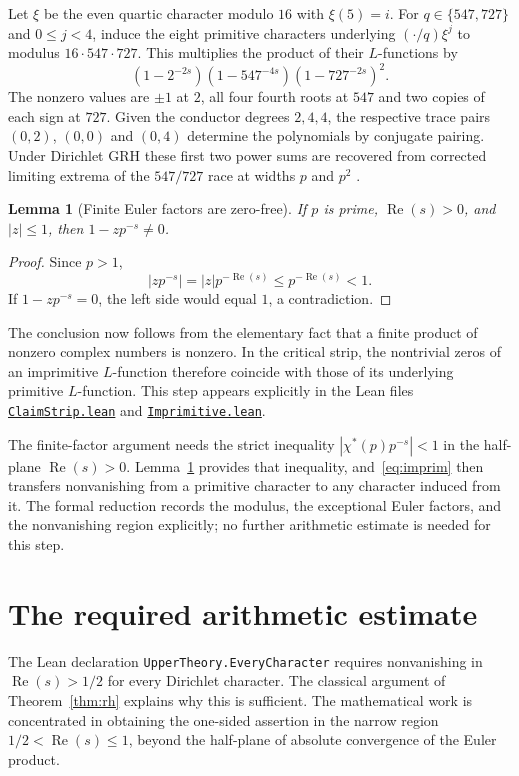 \documentclass[11pt,openany,oneside]{scrbook}
\newtheorem{lemma}[theorem]{Lemma}
\theoremstyle{definition}
\theoremstyle{remark}
\newcommand{\Rea}{\operatorname{Re}}
\newcommand{\baseurl}{https://github.com/CocoSgt/riemann-hypothesis-lean/blob/7cbf7a0c32fca1badf05931879a37c3f8a2b03b4/}
\newcommand{\sourcefile}[2]{\href{\baseurl#1}{\texttt{#2}}}
\begin{document}
Let $\xi$ be the even quartic character modulo $16$ with $\xi(5)=i$. For $q\in\{547,727\}$ and $0\le j<4$, induce the eight primitive characters underlying $(\cdot/q)\xi^j$ to modulus $16\cdot547\cdot727$. This multiplies the product of their $L$-functions by
\[
(1-2^{-2s})(1-547^{-4s})(1-727^{-2s})^2.
\]
The nonzero values are $\pm1$ at $2$, all four fourth roots at $547$ and two copies of each sign at $727$. Given the conductor degrees $2,4,4$, the respective trace pairs $(0,2)$, $(0,0)$ and $(0,4)$ determine the polynomials by conjugate pairing. Under Dirichlet GRH these first two power sums are recovered from corrected limiting extrema of the $547/727$ race at widths $p$ and $p^2$ \parencite{Crossley2026WidthCusp}.

\begin{lemma}[Finite Euler factors are zero-free]\label{lem:euler}
If $p$ is prime, $\Rea(s)>0$, and $|z|\le1$, then $1-zp^{-s}\ne0$.
\end{lemma}
\begin{proof}
Since $p>1$,
\[
|zp^{-s}|=|z|p^{-\Rea(s)}\le p^{-\Rea(s)}<1.
\]
If $1-zp^{-s}=0$, the left side would equal $1$, a contradiction.
\end{proof}

The conclusion now follows from the elementary fact that a finite product of nonzero complex numbers is nonzero. In the critical strip, the nontrivial zeros of an imprimitive $L$-function therefore coincide with those of its underlying primitive $L$-function. This step appears explicitly in the Lean files \sourcefile{src/Development/AutomorphicArithmetic/CharacterBoxes/ClaimStrip.lean}{ClaimStrip.lean} and \sourcefile{src/Development/AutomorphicArithmetic/CharacterBoxes/Imprimitive.lean}{Imprimitive.lean}.

The finite-factor argument needs the strict inequality $|\chi^*(p)p^{-s}|<1$ in the half-plane $\Rea(s)>0$. Lemma~\ref{lem:euler} provides that inequality, and~\eqref{eq:imprim} then transfers nonvanishing from a primitive character to any character induced from it. The formal reduction records the modulus, the exceptional Euler factors, and the nonvanishing region explicitly; no further arithmetic estimate is needed for this step.

\section{The required arithmetic estimate}
The Lean declaration \texttt{UpperTheory.EveryCharacter} requires nonvanishing in $\Rea(s)>1/2$ for every Dirichlet character. The classical argument of Theorem~\ref{thm:rh} explains why this is sufficient. The mathematical work is concentrated in obtaining the one-sided assertion in the narrow region $1/2<\Rea(s)\le1$, beyond the half-plane of absolute convergence of the Euler product.
\end{document}
